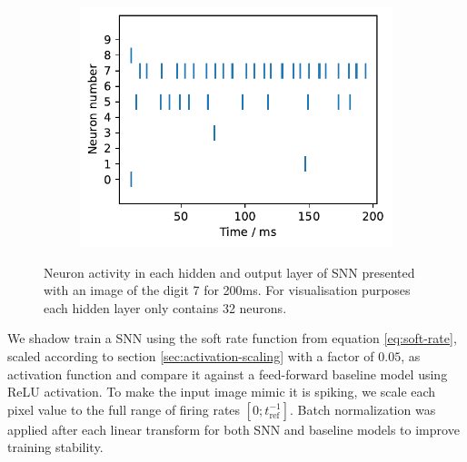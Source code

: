 \documentclass[a4paper,11pt]{article} %
\begin{document}
\begin{figure}[ht]
\begin{subfigure}[t]{0.32\columnwidth}
    \includegraphics[width=\linewidth]{graphics/spikes_2.pdf}  
  \end{subfigure}
  \caption{Neuron activity in each hidden and output layer of SNN presented with an image of the digit 7 for 200ms. For visualisation purposes each hidden layer only contains 32 neurons.}

\end{figure}
We shadow train a SNN using the soft rate function from equation \ref{eq:soft-rate}, scaled according to section \ref{sec:activation-scaling} with a factor of $0.05$, as activation function and compare it against a feed-forward baseline model using ReLU activation. To make the input image mimic it is spiking, we scale each pixel value to the full range of firing rates $[0; t_\text{ref}^{-1}]$. Batch normalization was applied after each linear transform for both SNN and baseline models to improve training stability. 
\end{document}
